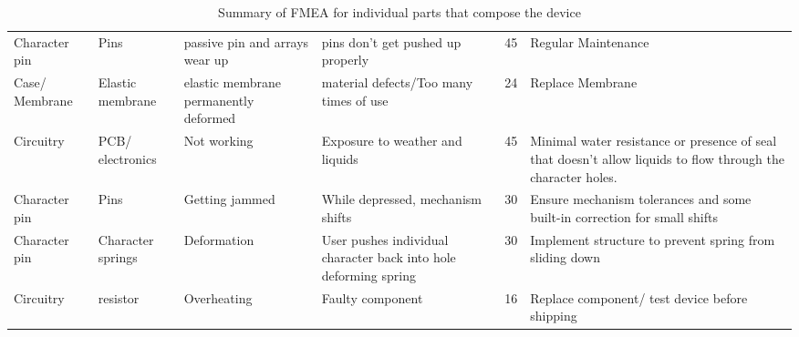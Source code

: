 \begin{table}[!ht]
\begin{tabular}{b{1.7cm} b{2cm} b{2.5cm} b{4cm}l b{6cm}}
            Character pin & Pins & passive pin and arrays wear up & pins don't get pushed up properly & 45 & Regular Maintenance \\ 
            Case/ Membrane & Elastic membrane & elastic membrane permanently deformed & material defects/Too many times of use & 24 & Replace Membrane  \\ 
            Circuitry & PCB/ electronics & Not working & Exposure to weather and liquids & 45 & Minimal water resistance or presence of seal that doesn't allow liquids to flow through the character holes. \\ 
            Character pin & Pins & Getting jammed & While depressed, mechanism shifts & 30 & Ensure mechanism tolerances and some built-in correction for small shifts \\ 
            Character pin & Character springs & Deformation & User pushes individual character back into hole deforming spring & 30 & Implement structure to prevent spring from sliding down \\ 
            Circuitry & resistor & Overheating & Faulty component & 16 & Replace component/ test device before shipping \\ \hline
        \end{tabular}
        \caption{Summary of FMEA for individual parts that compose the device}
        \label{tb:FMEA-parts}
    \end{table}
\restoregeometry

